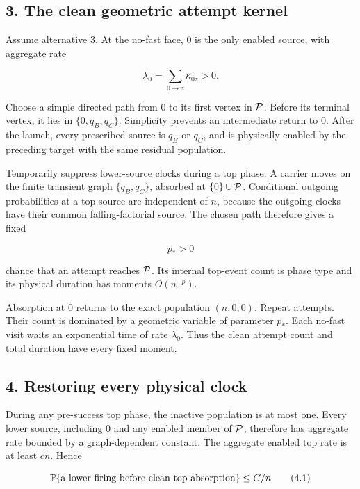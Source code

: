 \subsection{3. The clean geometric attempt
kernel}

Assume alternative 3. At the no-fast face, \(0\) is the only enabled
source, with aggregate rate

\[
                 \lambda_0=\sum_{0\to z}\kappa_{0z}>0.        \tag{3.1}
\]

Choose a simple directed path from \(0\) to its first vertex in
\({\cal P}\). Before its terminal vertex, it lies in \(\{0,q_B,q_C\}\).
Simplicity prevents an intermediate return to \(0\). After the launch,
every prescribed source is \(q_B\) or \(q_C\), and is physically enabled
by the preceding target with the same residual population.

Temporarily suppress lower-source clocks during a top phase. A carrier
moves on the finite transient graph \(\{q_B,q_C\}\), absorbed at
\(\{0\}\cup{\cal P}\). Conditional outgoing probabilities at a top
source are independent of \(n\), because the outgoing clocks have their
common falling-factorial source. The chosen path therefore gives a fixed

\[
                              p_*>0                            \tag{3.2}
\]

chance that an attempt reaches \({\cal P}\). Its internal top-event
count is phase type and its physical duration has moments \(O(n^{-p})\).

Absorption at \(0\) returns to the exact population \((n,0,0)\). Repeat
attempts. Their count is dominated by a geometric variable of parameter
\(p_*\). Each no-fast visit waits an exponential time of rate
\(\lambda_0\). Thus the clean attempt count and total duration have
every fixed moment.

\subsection{4. Restoring every physical
clock}

During any pre-success top phase, the inactive population is at most
one. Every lower source, including \(0\) and any enabled member of
\({\cal P}\), therefore has aggregate rate bounded by a graph-dependent
constant. The aggregate enabled top rate is at least \(cn\). Hence

\[
 \mathbb P\{\hbox{a lower firing before clean top absorption}\}
       \le C/n                                                \tag{4.1}
\]


